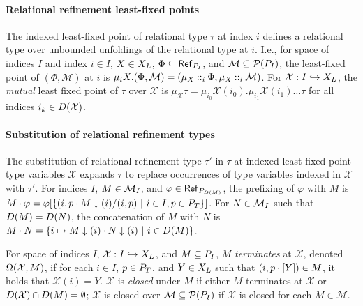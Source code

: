 \paragraph{Relational refinement least-fixed points}
The indexed least-fixed point of relational type $\tau$ at index $i$
defines a relational type over unbounded unfoldings of the relational
type at $i$.
%
I.e., for space of indices $I$ and index $i \in I$, $X \in X_L$,
$\Phi \subseteq \mathsf{Ref}_{ P_{I} }$, and
$\mathcal{M} \subseteq \mathcal{P}(P_{I})$, the least-fixed point of
$(\Phi, \mathcal{M})$ at $i$ is $\mu_i X. (\Phi, \mathcal{M}) = %
(\mu_X \prepend{i} \Phi, \mu_X \prepend{i} \mathcal{M})$.
%
For $\mathcal{X} : I \hookrightarrow X_L$, the \emph{mutual} least fixed
point of $\tau$ over $\mathcal{X}$ is
$\mu_\mathcal{X} \tau = \mu_{i_0} \mathcal{X}(i_0). \mu_{i_1}
\mathcal{X}(i_1) \ldots \tau$ for all indices
$i_k \in D(\mathcal{X})$.

\paragraph{Substitution of relational refinement types}
%
The substitution of relational refinement type $\tau'$ in $\tau$ at
indexed least-fixed-point type variables $\mathcal{X}$ expands $\tau$
to replace occurrences of type variables indexed in $\mathcal{X}$ with
$\tau'$.
For indices $I$, $M \in \mathcal{M}_I$, and
$\varphi \in \mathsf{Ref}_{ P_{ D(M) } }$, the prefixing of
$\varphi$ with $M$ is
$M \cdot \varphi = \varphi[ \{  (i, p \cdot M\downarrow(i)
  / (i, p) \ |\  i \in I, p \in P_T  \} ]$.
For $N \in \mathcal{M}_I$ such that $D(M) = D(N)$, the
concatenation of $M$ with $N$ is
$M \cdot N = \{  i \mapsto M\downarrow(i) \cdot
  N\downarrow(i) \ |\  i \in D(M)  \}$.

For space of indices $I$, $\mathcal{X} : I \hookrightarrow X_L$, and
$M \subseteq P_{I}$, $M$ \emph{terminates} at $\mathcal{X}$,
denoted $\Omega( \mathcal{X} ,  M )$, if for each $i \in I$,
$p \in P_T$, and $Y \in X_L$ such that
$(i, p \cdot [ Y ]) \in M$, it holds that $\mathcal{X}(i) = Y$.
%
$\mathcal{X}$ is \emph{closed} under $M$ if either $M$ terminates at
$\mathcal{X}$ or
$D(\mathcal{X}) \cap D(M) = \emptyset$;
%
$\mathcal{X}$ is closed over $\mathcal{M} \subseteq \mathcal{P}(P_{I})$
if $\mathcal{X}$ is closed for each $M \in \mathcal{M}$.

